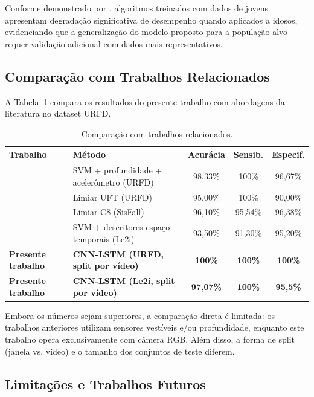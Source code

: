 \documentclass[12pt,a4paper]{article}
\begin{document}
Conforme demonstrado por \citet{sisfall2017}, algoritmos treinados com dados de jovens apresentam degradação significativa de desempenho quando aplicados a idosos, evidenciando que a generalização do modelo proposto para a população-alvo requer validação adicional com dados mais representativos.

\subsection{Comparação com Trabalhos Relacionados}

A Tabela~\ref{tab:comparacao} compara os resultados do presente trabalho com abordagens da literatura no dataset URFD.

\begin{table}[H]
\centering
\caption{Comparação com trabalhos relacionados.}
\label{tab:comparacao}
\begin{tabularx}{\textwidth}{lXccc}
\toprule
\textbf{Trabalho} & \textbf{Método} & \textbf{Acurácia} & \textbf{Sensib.} & \textbf{Especif.} \\
\midrule
\citet{kwolek2014} & SVM + profundidade + acelerômetro (URFD) & 98,33\% & 100\% & 96,67\% \\
\citet{kwolek2014} & Limiar UFT (URFD) & 95,00\% & 100\% & 90,00\% \\
\citet{sisfall2017} & Limiar C8 (SisFall) & 96,10\% & 95,54\% & 96,38\% \\
\citet{charfi2013} & SVM + descritores espaço-temporais (Le2i) & 93,50\% & 91,30\% & 95,20\% \\
\textbf{Presente trabalho} & \textbf{CNN-LSTM (URFD, split por vídeo)} & \textbf{100\%} & \textbf{100\%} & \textbf{100\%} \\
\textbf{Presente trabalho} & \textbf{CNN-LSTM (Le2i, split por vídeo)} & \textbf{97,07\%} & \textbf{100\%} & \textbf{95,5\%} \\
\bottomrule
\end{tabularx}
\end{table}

Embora os números sejam superiores, a comparação direta é limitada: os trabalhos anteriores utilizam sensores vestíveis e/ou profundidade, enquanto este trabalho opera exclusivamente com câmera RGB. Além disso, a forma de split (janela vs. vídeo) e o tamanho dos conjuntos de teste diferem.

\subsection{Limitações e Trabalhos Futuros}
\end{document}
